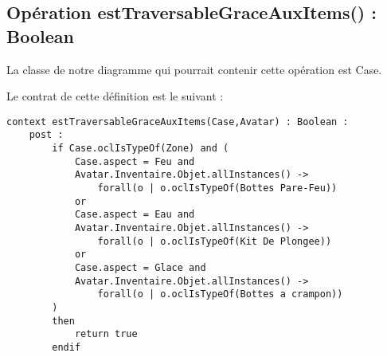 
\subsection{Opération estTraversableGraceAuxItems() : Boolean}
\label{sec:question17}

La classe de notre diagramme qui pourrait contenir cette opération est Case.

Le contrat de cette définition est le suivant :

\begin{lstlisting}[caption=Contrat \textsc{Ocl} sur l'opération estTraversableGraceAuxItems,captionpos=b,label={lst:operation},language=OCL]
context estTraversableGraceAuxItems(Case,Avatar) : Boolean :
    post :
        if Case.oclIsTypeOf(Zone) and (
            Case.aspect = Feu and
            Avatar.Inventaire.Objet.allInstances() ->
                forall(o | o.oclIsTypeOf(Bottes Pare-Feu))
            or
            Case.aspect = Eau and
            Avatar.Inventaire.Objet.allInstances() ->
                forall(o | o.oclIsTypeOf(Kit De Plongee))
            or
            Case.aspect = Glace and
            Avatar.Inventaire.Objet.allInstances() ->
                forall(o | o.oclIsTypeOf(Bottes a crampon))
        )
        then
            return true
        endif

\end{lstlisting}